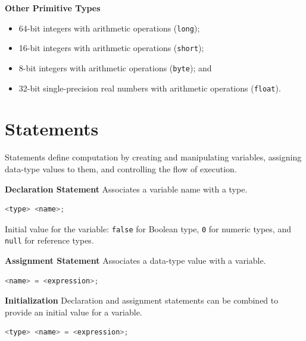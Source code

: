 \documentclass[8pt,a4paper,compress]{beamer}
\begin{document}
\begin{frame}[fragile]
\pause
\smallskip

\textbf{Other Primitive Types} 
\begin{itemize}
\item 64-bit integers with arithmetic operations (\lstinline$long$); 
\item 16-bit integers with arithmetic operations (\lstinline$short$);
\item 8-bit integers with arithmetic operations (\lstinline$byte$); and
\item 32-bit single-precision real numbers with arithmetic operations (\lstinline$float$).
\end{itemize}

\end{frame}

\section{Statements}
\begin{frame}[fragile]
\pause

Statements define computation by creating and manipulating variables, assigning data-type values to them, and controlling the flow of execution.

\pause
\smallskip

\textbf{Declaration Statement}
Associates a variable name with a type.
\begin{lstlisting}[language=Java]
<type> <name>;
\end{lstlisting}
Initial value for the variable: \lstinline$false$ for Boolean type, \lstinline$0$ for numeric types, and \lstinline$null$ for reference types.

\pause
\smallskip

\textbf{Assignment Statement}
Associates a data-type value with a variable.
\begin{lstlisting}[language=Java]
<name> = <expression>;
\end{lstlisting}

\pause
\smallskip

\textbf{Initialization} Declaration and assignment statements can be combined to provide an initial value for a variable.
\begin{lstlisting}[language=Java]
<type> <name> = <expression>;
\end{lstlisting}
\end{frame}
\end{document}
